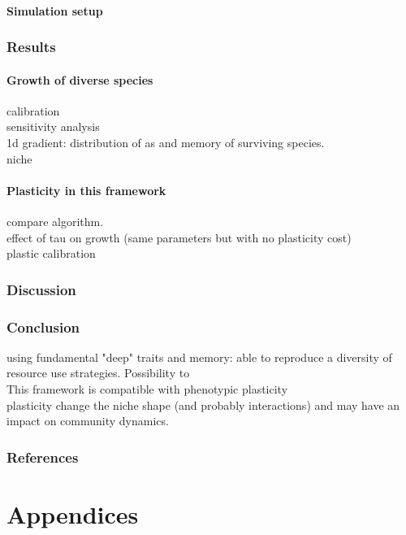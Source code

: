 \documentclass[review]{elsarticle}
\begin{document}
\subsection{Simulation setup}

\section{Results}
\subsection{Growth of diverse species}
calibration\\
sensitivity analysis\\
1d gradient: distribution of as and memory of surviving species.\\
niche\\

\subsection{Plasticity in this framework}
compare algorithm.\\
effect of tau on growth (same parameters but with no plasticity cost)\\
plastic calibration\\


\section{Discussion}

\section{Conclusion}
using fundamental "deep" traits and memory: able to reproduce a diversity of resource use strategies. Possibility to \\
This framework is compatible with phenotypic plasticity\\
plasticity change the niche shape (and probably interactions) and may have an impact on community dynamics.


\section*{References}
\cite{Dirac1953888}


\part*{Appendices}
\end{document}
